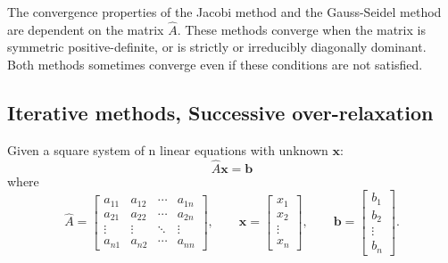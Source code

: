 \documentclass[%
twoside,                 %
final,                   %
10pt]{article}
\begin{document}
{{{{{{{\begin{block}{}
The convergence properties of the Jacobi method and the 
Gauss-Seidel method are dependent on the matrix $\hat{A}$. These methods converge when
the matrix is symmetric positive-definite, or is strictly or irreducibly diagonally dominant.
Both methods sometimes converge even if these conditions are not satisfied.
\end{block}

\subsection{Iterative methods, Successive over-relaxation}
\begin{block}{}
Given a square system of n linear equations with unknown $\mathbf x$:
\[
    \hat{A}\mathbf x = \mathbf b
\]
where
\[
    \hat{A}=\begin{bmatrix} a_{11} & a_{12} & \cdots & a_{1n} \\ a_{21} & a_{22} & \cdots & a_{2n} \\ \vdots & \vdots & \ddots & \vdots \\a_{n1} & a_{n2} & \cdots & a_{nn} \end{bmatrix}, \qquad \mathbf{x} = \begin{bmatrix} x_{1} \\ x_2 \\ \vdots \\ x_n \end{bmatrix} , \qquad \mathbf{b} = \begin{bmatrix} b_{1} \\ b_2 \\ \vdots \\ b_n \end{bmatrix}.
\]
\end{block}


}}}}}}}
\end{document}
